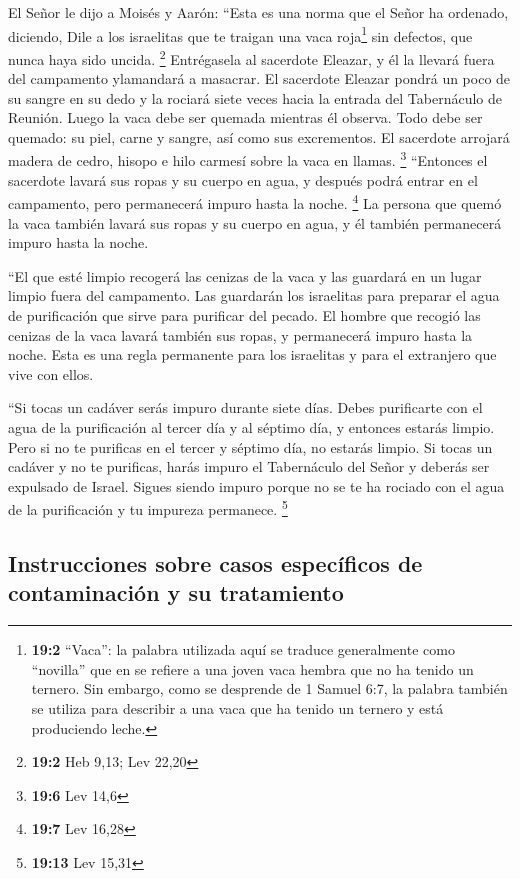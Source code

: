  El Señor le dijo a Moisés y Aarón:  ``Esta
es una norma que el Señor ha ordenado, diciendo, Dile a los israelitas
que te traigan una vaca roja\footnote{\textbf{19:2} ``Vaca'': la palabra
  utilizada aquí se traduce generalmente como ``novilla'' que en se
  refiere a una joven vaca hembra que no ha tenido un ternero. Sin
  embargo, como se desprende de 1 Samuel 6:7, la palabra también se
  utiliza para describir a una vaca que ha tenido un ternero y está
  produciendo leche.} sin defectos, que nunca haya sido uncida.
\footnote{\textbf{19:2} Heb 9,13; Lev 22,20}  Entrégasela
al sacerdote Eleazar, y él la llevará fuera del campamento ylamandará a
masacrar.  El sacerdote Eleazar pondrá un poco de su
sangre en su dedo y la rociará siete veces hacia la entrada del
Tabernáculo de Reunión.  Luego la vaca debe ser quemada
mientras él observa. Todo debe ser quemado: su piel, carne y sangre, así
como sus excrementos.  El sacerdote arrojará madera de
cedro, hisopo e hilo carmesí sobre la vaca en llamas. \footnote{\textbf{19:6}
  Lev 14,6}  ``Entonces el sacerdote lavará sus ropas y su
cuerpo en agua, y después podrá entrar en el campamento, pero
permanecerá impuro hasta la noche. \footnote{\textbf{19:7} Lev 16,28}
 La persona que quemó la vaca también lavará sus ropas y
su cuerpo en agua, y él también permanecerá impuro hasta la noche.

 ``El que esté limpio recogerá las cenizas de la vaca y
las guardará en un lugar limpio fuera del campamento. Las guardarán los
israelitas para preparar el agua de purificación que sirve para
purificar del pecado.  El hombre que recogió las cenizas
de la vaca lavará también sus ropas, y permanecerá impuro hasta la
noche. Esta es una regla permanente para los israelitas y para el
extranjero que vive con ellos.

 ``Si tocas un cadáver serás impuro durante siete días.
 Debes purificarte con el agua de la purificación al
tercer día y al séptimo día, y entonces estarás limpio. Pero si no te
purificas en el tercer y séptimo día, no estarás limpio. 
Si tocas un cadáver y no te purificas, harás impuro el Tabernáculo del
Señor y deberás ser expulsado de Israel. Sigues siendo impuro porque no
se te ha rociado con el agua de la purificación y tu impureza permanece.
\footnote{\textbf{19:13} Lev 15,31}

\hypertarget{instrucciones-sobre-casos-especuxedficos-de-contaminaciuxf3n-y-su-tratamiento}{%
\subsection{Instrucciones sobre casos específicos de contaminación y su
tratamiento}\label{instrucciones-sobre-casos-especuxedficos-de-contaminaciuxf3n-y-su-tratamiento}}

